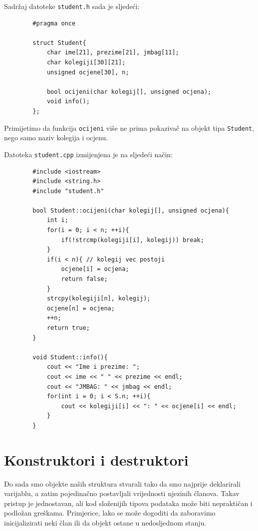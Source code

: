 \begin{rjesenje}
Sadržaj datoteke \texttt{student.h} sada je sljedeći:
 \begin{verbatim}
        #pragma once

        struct Student{
            char ime[21], prezime[21], jmbag[11];
            char kolegiji[30][21];
            unsigned ocjene[30], n;

            bool ocijeni(char kolegij[], unsigned ocjena);
            void info();
        };
    \end{verbatim}
    Primijetimo da funkcija \texttt{ocijeni} više ne prima pokazivač na objekt tipa \texttt{Student}, nego samo naziv kolegija i ocjenu.   

    Datoteka \texttt{student.cpp} izmijenjena je na sljedeći način:
    
    \begin{verbatim}
        #include <iostream>
        #include <string.h>
        #include "student.h"

        bool Student::ocijeni(char kolegij[], unsigned ocjena){
            int i;
            for(i = 0; i < n; ++i){
                if(!strcmp(kolegiji[i], kolegij)) break;
            }
            if(i < n){ // kolegij vec postoji
                ocjene[i] = ocjena;
                return false;
            }
            strcpy(kolegiji[n], kolegij);
            ocjene[n] = ocjena;
            ++n;
            return true;
        }

        void Student::info(){
            cout << "Ime i prezime: ";
            cout << ime << " " << prezime << endl;
            cout << "JMBAG: " << jmbag << endl;
            for(int i = 0; i < S.n; ++i){
                cout << kolegiji[i] << ": " << ocjene[i] << endl;
            }
        }
    \end{verbatim}
\end{rjesenje}

\section{Konstruktori i destruktori}
Do sada smo objekte naših struktura stvarali tako da smo najprije deklarirali varijablu, a zatim pojedinačno postavljali vrijednosti njezinih članova. 
Takav pristup je jednostavan, ali kod složenijih tipova podataka može biti nepraktičan i podložan greškama. Primjerice, lako se može dogoditi da zaboravimo inicijalizirati neki član ili da objekt ostane u nedosljednom stanju.

